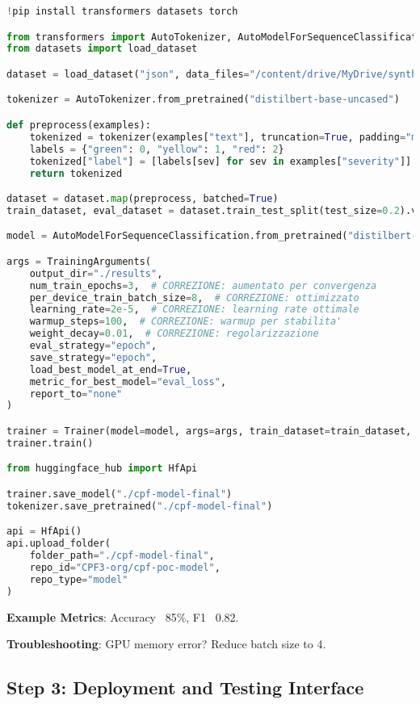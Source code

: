 \documentclass[11pt,a4paper]{article}
\begin{document}
\begin{lstlisting}[language=Python, caption=Model Fine-Tuning]
!pip install transformers datasets torch

from transformers import AutoTokenizer, AutoModelForSequenceClassification, Trainer, TrainingArguments
from datasets import load_dataset

dataset = load_dataset("json", data_files="/content/drive/MyDrive/synthetic_data.json", split="train")

tokenizer = AutoTokenizer.from_pretrained("distilbert-base-uncased")

def preprocess(examples):
    tokenized = tokenizer(examples["text"], truncation=True, padding="max_length", max_length=128)
    labels = {"green": 0, "yellow": 1, "red": 2}
    tokenized["label"] = [labels[sev] for sev in examples["severity"]]
    return tokenized

dataset = dataset.map(preprocess, batched=True)
train_dataset, eval_dataset = dataset.train_test_split(test_size=0.2).values()

model = AutoModelForSequenceClassification.from_pretrained("distilbert-base-uncased", num_labels=3)

args = TrainingArguments(
    output_dir="./results",
    num_train_epochs=3,  # CORREZIONE: aumentato per convergenza
    per_device_train_batch_size=8,  # CORREZIONE: ottimizzato
    learning_rate=2e-5,  # CORREZIONE: learning rate ottimale
    warmup_steps=100,  # CORREZIONE: warmup per stabilita'
    weight_decay=0.01,  # CORREZIONE: regolarizzazione
    eval_strategy="epoch",
    save_strategy="epoch",
    load_best_model_at_end=True,
    metric_for_best_model="eval_loss",
    report_to="none"
)

trainer = Trainer(model=model, args=args, train_dataset=train_dataset, eval_dataset=eval_dataset)
trainer.train()

from huggingface_hub import HfApi

trainer.save_model("./cpf-model-final") 
tokenizer.save_pretrained("./cpf-model-final")

api = HfApi()
api.upload_folder(
    folder_path="./cpf-model-final",
    repo_id="CPF3-org/cpf-poc-model",
    repo_type="model"
)
\end{lstlisting}

\textbf{Example Metrics}: Accuracy ~85\%, F1 ~0.82.

\textbf{Troubleshooting}: GPU memory error? Reduce batch size to 4.

\subsection{Step 3: Deployment and Testing Interface}
\end{document}
